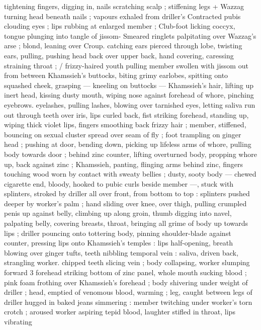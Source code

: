 tightening fingers, digging in, nails scratching scalp ; stiffening legs 
+ Wazzag turning head beneath nails ; vapours exhaled from driller's 
Contracted pubis clouding eyes ; lips rubbing at enlarged member ; 
Club-foot licking coccyx, tongue plunging into tangle of jissom- 
Smeared ringlets palpitating over Wazzag's arse ; blond, leaning over 
Croup. catching ears pierced through lobe, twisting ears, pulling, 
pushing head back over upper back, hand covering, caressing 
straining throat ; {\slash} frizzy-haired youth pulling member swollen with 
jissom out from between Khamssieh's buttocks, biting grimy 
earlobes, spitting onto squashed cheek, grasping --- kneeling on 
buttocks --- Khamssieh's hair, lifting up inert head, kissing dusty 
mouth, wiping nose against forehead of whore, pinching eyebrows. 
eyelashes, pulling lashes, blowing over tarnished eyes, letting saliva 
run out through teeth over iris, lips curled back, fist striking 
forehead, standing up, wiping thick violet lips, fingers smoothing 
back frizzy hair ; member, stiffened, bouncing on sexual cluster 
spread over seam of fly ; foot trampling on ginger head ; pushing at 
door, bending down, picking up lifeless arms of whore, pulling body 
towards door ; behind zinc counter, lifting overturned body, propping 
whore up, back against zinc ; Khamssieh, panting, flinging arms 
behind zinc, fingers touching wood worn by contact with sweaty 
bellies ; dusty, sooty body --- chewed cigarette end, bloody, hooked 
to pubic curls beside member ---, stuck with splinters, stroked by 
driller all over front, from bottom to top : splinters pushed deeper by 
worker's palm ; hand sliding over knee, over thigh, pulling crumpled 
penis up against belly, climbing up along groin, thumb digging into 
navel, palpating belly, covering breasts, throat, bringing all grime of 
body up towards lips ; driller pouncing onto tottering body, pinning 
shoulder-blade against counter, pressing lips onto Khamssieh's 
temples : lips half-opening, breath blowing over ginger tufts, teeth 
nibbling temporal vein : saliva, driven back, strangling worker. 
chipped teeth slicing vein ; body collapsing, worker slumping forward 
3 forehead striking bottom of zinc panel, whole mouth sucking blood 
; pink foam frothing over Khamssieh's forehead ; body shivering 
under weight of driller ; head, emptied of venomous blood, warming 
; leg, caught between legs of driller hugged in baked jeans 
simmering : member twitching under worker's torn crotch ; aroused 
worker aspiring tepid blood, laughter stifled in throat, lips vibrating 
